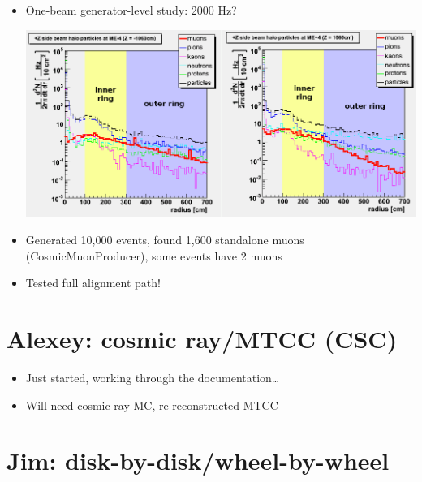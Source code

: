 \documentclass[compress]{beamer}
\begin{document}
\begin{frame}
\begin{itemize}\setlength{\itemsep}{0.4 cm}
\item One-beam generator-level study: 2000 Hz?
\begin{center}
\includegraphics[width=\linewidth]{beam_halo_profiles.png}
\end{center}

\item Generated 10,000 events, found 1,600 standalone muons (CosmicMuonProducer), some events have 2 muons

\item Tested full alignment path!
\end{itemize}
\end{frame}

\section*{Alexey: cosmic ray/MTCC (CSC)}

\begin{frame}
\begin{itemize}\setlength{\itemsep}{1 cm}
\item Just started, working through the documentation\ldots
\item Will need cosmic ray MC, re-reconstructed MTCC
\end{itemize}
\end{frame}

\section*{Jim: disk-by-disk/wheel-by-wheel}
\end{document}
